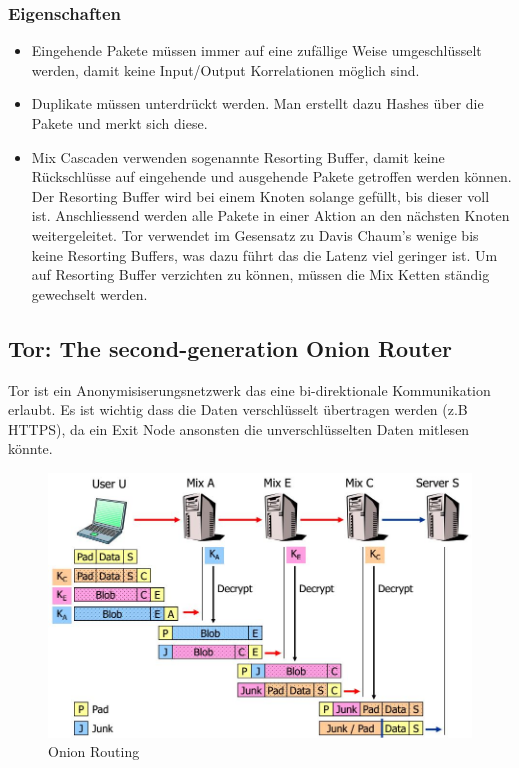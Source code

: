 \subsubsection{Eigenschaften}
\begin{itemize}
	\item Eingehende Pakete müssen immer auf eine zufällige Weise umgeschlüsselt werden, damit keine Input/Output Korrelationen möglich sind.
	\item Duplikate müssen unterdrückt werden. Man erstellt dazu Hashes über die Pakete und merkt sich diese.
	\item Mix Cascaden verwenden sogenannte Resorting Buffer, damit keine Rückschlüsse auf eingehende und ausgehende Pakete getroffen werden können. Der Resorting Buffer wird bei einem Knoten solange gefüllt, bis dieser voll ist. Anschliessend werden alle Pakete in einer Aktion an den nächsten Knoten weitergeleitet. Tor verwendet im Gesensatz zu Davis Chaum's wenige bis keine Resorting Buffers, was dazu führt das die Latenz viel geringer ist. Um auf Resorting Buffer verzichten zu können, müssen die Mix Ketten ständig gewechselt werden. 
\end{itemize}



\subsection{Tor: The second-generation Onion Router}
\label{sec:tor}
Tor ist ein Anonymisiserungsnetzwerk das eine bi-direktionale Kommunikation erlaubt. Es ist wichtig dass die Daten verschlüsselt übertragen werden (z.B HTTPS), da ein Exit Node ansonsten die unverschlüsselten Daten mitlesen könnte.

\begin{figure}[h]
	\centering
	\includegraphics[width=0.7\linewidth]{images/onion_routing}
	\caption{Onion Routing}
	\label{fig:onionrouting}
\end{figure}

